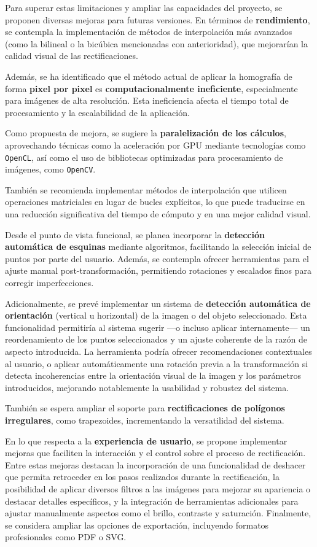 Para superar estas limitaciones y ampliar las capacidades del proyecto, se proponen diversas mejoras para futuras versiones. En términos de \textbf{rendimiento}, se contempla la implementación de métodos de interpolación más avanzados (como la bilineal o la bicúbica mencionadas con anterioridad), que mejorarían la calidad visual de las rectificaciones.

Además, se ha identificado que el método actual de aplicar la homografía de forma \textbf{pixel por pixel} es \textbf{computacionalmente ineficiente}, especialmente para imágenes de alta resolución. Esta ineficiencia afecta el tiempo total de procesamiento y la escalabilidad de la aplicación.

Como propuesta de mejora, se sugiere la \textbf{paralelización de los cálculos}, aprovechando técnicas como la aceleración por GPU mediante tecnologías como \texttt{OpenCL}, así como el uso de bibliotecas optimizadas para procesamiento de imágenes, como \texttt{OpenCV}. 

También se recomienda implementar métodos de interpolación que utilicen operaciones matriciales en lugar de bucles explícitos, lo que puede traducirse en una reducción significativa del tiempo de cómputo y en una mejor calidad visual.

Desde el punto de vista funcional, se planea incorporar la \textbf{detección automática de esquinas} mediante algoritmos, facilitando la selección inicial de puntos por parte del usuario. Además, se contempla ofrecer herramientas para el ajuste manual post-transformación, permitiendo rotaciones y escalados finos para corregir imperfecciones.

Adicionalmente, se prevé implementar un sistema de \textbf{detección automática de orientación} (vertical u horizontal) de la imagen o del objeto seleccionado. Esta funcionalidad permitiría al sistema sugerir —o incluso aplicar internamente— un reordenamiento de los puntos seleccionados y un ajuste coherente de la razón de aspecto introducida. La herramienta podría ofrecer recomendaciones contextuales al usuario, o aplicar automáticamente una rotación previa a la transformación si detecta incoherencias entre la orientación visual de la imagen y los parámetros introducidos, mejorando notablemente la usabilidad y robustez del sistema.


También se espera ampliar el soporte para \textbf{rectificaciones de polígonos irregulares}, como trapezoides, incrementando la versatilidad del sistema.

En lo que respecta a la \textbf{experiencia de usuario}, se propone implementar mejoras que faciliten la interacción y el control sobre el proceso de rectificación. Entre estas mejoras destacan la incorporación de una funcionalidad de deshacer que permita retroceder en los pasos realizados durante la rectificación, la posibilidad de aplicar diversos filtros a las imágenes para mejorar su apariencia o destacar detalles específicos, y la integración de herramientas adicionales para ajustar manualmente aspectos como el brillo, contraste y saturación. Finalmente, se considera ampliar las opciones de exportación, incluyendo formatos profesionales como PDF o SVG.

